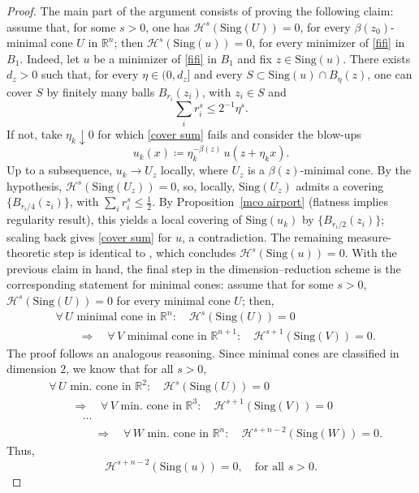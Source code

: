 \documentclass[reqno,11pt]{amsart}
\newcommand{\sing}{\text{Sing}}
\newcommand{\1}{\mathds{1}}
\numberwithin{equation}{section}
\begin{document}
\begin{proof}
The main part of the argument consists of proving the following claim: assume that, for some $s>0$, one has $\mathcal{H}^s(\sing(U))=0$, for every $\beta(z_0)$-minimal cone $U$ in $\mathbb{R}^n$; then $\mathcal{H}^s(\sing(u))=0$, for every minimizer of \eqref{fifi} in $B_1$. Indeed, let $u$ be a minimizer of \eqref{fifi} in $B_1$ and fix $z\in\sing(u)$. There exists $d_z>0$ such that, for every $\eta \in(0,d_z]$ and every $S\subset \sing(u)\cap B_\eta(z)$, one can cover $S$ by finitely many balls $B_{r_i}(z_i)$, with $z_i\in S$ and
\begin{equation}\label{cover sum}
\sum_i r_i^s \le 2^{-1}\eta^s.
\end{equation}
If not, take $\eta_k\downarrow 0$ for which \eqref{cover sum} fails and consider the blow-ups
$$
    u_k(x)\coloneqq \eta_k^{-\beta(z)}\,u(z+\eta_k x).
$$
Up to a subsequence, $u_k \to U_z$ locally, where $U_z$ is a $\beta(z)$-minimal cone. 
By the hypothesis, $\mathcal{H}^s(\sing(U_z))=0$, so, locally, $\sing(U_z)$ admits a covering 
$\{B_{r_i/4}(z_i)\}$, with $\sum_i r_i^s \le \tfrac12$. 
By Proposition~\ref{mco airport} (flatness implies regularity result), this yields a local covering of 
$\sing(u_k)$ by $\{B_{r_i/2}(z_i)\}$; scaling back gives \eqref{cover sum} for $u$, a contradiction. The remaining measure-theoretic step is identical to \cite[Proof of Lemma~5.7]{DSS0}, which concludes $\mathcal{H}^s(\sing(u))=0$. With the previous claim in hand, the final step in the dimension–reduction scheme is the corresponding statement for minimal cones: assume that for some $s>0$,
$\mathcal{H}^s(\sing(U))=0$ for every minimal cone $U$; then,
\[
\begin{aligned}
&\forall\, U \text{ minimal cone in } \mathbb{R}^n\colon \quad \mathcal{H}^s(\sing( U))=0 \\
&\qquad \Longrightarrow\quad 
\forall\, V \text{ minimal cone in } \mathbb{R}^{n+1}\colon \quad \mathcal{H}^{s+1}(\sing(V))=0 .
\end{aligned}
\] 
The proof follows an analogous reasoning. Since minimal cones are classified in dimension $2$, we know that for all $s>0$,
\[
\begin{aligned}
&\forall\, U \text{ min. cone in } \mathbb{R}^2\colon \quad \mathcal{H}^s(\sing( U))=0 \\
&\qquad \Longrightarrow\quad 
\forall\, V \text{ min. cone in } \mathbb{R}^{3}\colon \quad \mathcal{H}^{s+1}(\sing(V))=0\\
& \quad \qquad \cdots \\
& \qquad \qquad \Longrightarrow\quad \forall\, W \text{ min. cone in } \mathbb{R}^n\colon \quad \mathcal{H}^{s+n-2}(\sing(W))=0.
\end{aligned}
\]
Thus,
\[
\mathcal{H}^{s+n-2}(\sing(u))=0, \quad \text{for all } s>0.
\]


\end{proof}
\end{document}
